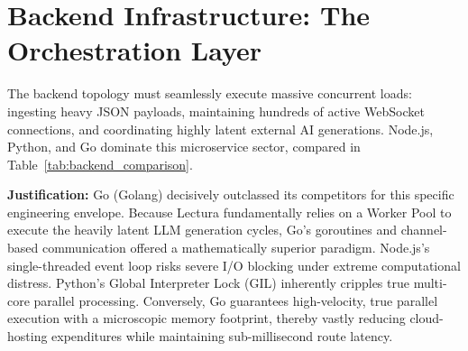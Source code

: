 \section{Backend Infrastructure: The Orchestration Layer}
The backend topology must seamlessly execute massive concurrent loads: ingesting heavy JSON payloads, maintaining hundreds of active WebSocket connections, and coordinating highly latent external AI generations. Node.js, Python, and Go dominate this microservice sector, compared in Table~\ref{tab:backend_comparison}.

\begin{table}[htbp]
\centering
{}
\vspace{6pt}
\caption{Infrastructure comparison analyzing backend orchestration capabilities.}
\label{tab:backend_comparison}
\end{table}

\textbf{Justification:} Go (Golang) decisively outclassed its competitors for this specific engineering envelope. Because Lectura fundamentally relies on a Worker Pool to execute the heavily latent LLM generation cycles, Go’s goroutines and channel-based communication offered a mathematically superior paradigm. Node.js’s single-threaded event loop risks severe I/O blocking under extreme computational distress. Python’s Global Interpreter Lock (GIL) inherently cripples true multi-core parallel processing. Conversely, Go guarantees high-velocity, true parallel execution with a microscopic memory footprint, thereby vastly reducing cloud-hosting expenditures while maintaining sub-millisecond route latency.

